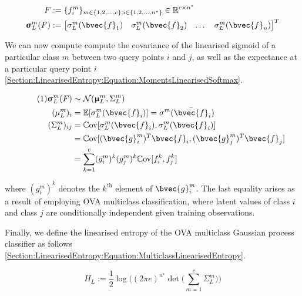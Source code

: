 \documentclass{article}
\renewcommand{\vec}[1]{\boldsymbol{#1}}
\newcommand\numberthis{\addtocounter{equation}{1}\tag{\theequation}}
\begin{document}
			\begin{equation}
				\begin{aligned}
					F &:= \{f^{m}_{i}\}_{m \in \{1, 2, \dots, c\}, i \in \{1, 2, \dots, n^{\star}\}} \in \mathbb{R}^{c \times n^{\star}} \\
					\vec{\upsigma}^{m}_{L}(F) &:= \begin{bmatrix} \sigma^{m}_{L}(\bvec{f}_{1}) & \sigma^{m}_{L}(\bvec{f}_{2}) & \dots & \sigma^{m}_{L}(\bvec{f}_{n}) \end{bmatrix}^{T}
				\end{aligned}
			\label{Section:LinearisedEntropy:Equation:Definitions}
			\end{equation}
						
			We can now compute compute the covariance of the linearised sigmoid of a particular class $m$ between two query points $i$ and $j$, as well as the expectance at a particular query point $i$ \eqref{Section:LinearisedEntropy:Equation:MomentsLinearisedSoftmax}.
			
			\begin{align*}
			\numberthis \label{Section:LinearisedEntropy:Equation:MomentsLinearisedSoftmax}
					\vec{\upsigma}^{m}_{L}(F) & \sim \mathcal{N}(\vec{\upmu}^{m}_{L}, \Sigma^{m}_{L}) \\
					(\mu^{m}_{L})_{i} & = \mathbb{E}[\sigma^{m}_{L}(\bvec{f}_{i})] =  \sigma^{m}(\bar{\bvec{f}}_{i}) \\
					(\Sigma^{m}_{L})_{ij} & = \mathbb{C}\mathrm{ov}[\sigma^{m}_{L}(\bvec{f}_{i}), \sigma^{m}_{L}(\bvec{f}_{i})] \\
					& = \mathbb{C}\mathrm{ov}[(\bvec{g}^{m}_{i})^{T} \bvec{f}_{i}, (\bvec{g}^{m}_{j})^{T} \bvec{f}_{j}] \\
					& = \sum_{k = 1}^{c} (g^{m}_{i})^{k} (g^{m}_{j})^{k} \mathbb{C}\mathrm{ov}[f^{k}_{i}, f^{k}_{j}]
			\end{align*}
						
			where $(g^{m}_{i})^{k}$ denotes the $k^{\text{th}}$ element of $\bvec{g}^{m}_{i}$. The last equality arises as a result of employing OVA multiclass classification, where latent values of class $i$ and class $j$ are conditionally independent given training observations.
			
			Finally, we define the linearised entropy of the OVA multiclass Gaussian process classifier as follows \eqref{Section:LinearisedEntropy:Equation:MulticlassLinearisedEntropy}.
			
			\begin{equation}
				H_{L} := \frac{1}{2} \log\Bigg((2 \pi e)^{n^{\star}} \det\bigg(\sum_{m = 1}^{c} \Sigma^{m}_{L}\bigg)\Bigg)
			\label{Section:LinearisedEntropy:Equation:MulticlassLinearisedEntropy}
			\end{equation}			
	
\end{document}
